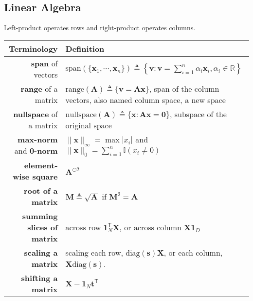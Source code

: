 \subsection{Linear Algebra}


Left-product operates rows and right-product operates columns.

\begin{table}[htpb]
    \centering
    \begin{tabular}{rp{24em}}
        \toprule
        Terminology & Definition \\
        \midrule
        
        \textbf{span} of vectors & $\text{span}(\{\bm{x}_1,\cdots,\bm{x}_n\})\triangleq\left\{\bm{v}:\bm{v}=\sum_{i=1}^n\alpha_i\bm{x}_i,\alpha_i\in\mathbb{R}\right\}$\\
    
        \textbf{range} of a matrix &
        $\text{range}(\mathbf{A})\triangleq\{\bm{v}=\mathbf{A}\bm{x}\}$, span of the column vectors, also named column space, a new space \\
    
        \textbf{nullspace} of a matrix & $\text{nullspace}(\mathbf{A})\triangleq{\{\bm{x}:\mathbf{A}\bm{x}=\bm{0}\}}$, subspace of the original space\\
        
        \textbf{max-norm} and \textbf{0-norm} &
        $\|\bm{x}\|_\infty=\max|x_i|$ and $\|\bm{x}\|_0=\sum_{i=1}^n\mathbb{I}(x_i\neq 0)$\\
        
        \textbf{element-wise square}                    & $\mathbf{A}^{\odot 2}$ \\
        \textbf{root of a matrix}                       & $\mathbf{M}\triangleq\sqrt{\mathbf{A}}$ if $\mathbf{M}^2=\mathbf{A}$ \\
        \textbf{summing slices of matrix}               & across row $\mathbf{1}_N^\mathsf{T}\mathbf{X}$, or across column $\mathbf{X1}_D$ \\
        \textbf{scaling a matrix}                       & scaling each row, $\mathrm{diag}(\bm{s})\mathbf{X}$, or each column, $\mathbf{X}\mathrm{diag}({\bm{s}})$. \\
        \textbf{shifting a matrix}                      & $\mathbf{X}-\mathbf{1}_N\bm{t}^\mathsf{T}$ \\
        

\end{tabular}
\end{table}

